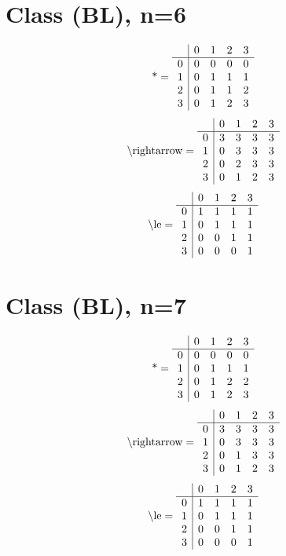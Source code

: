 \documentclass[11pt]{article}
\begin{document}
\section{Class (BL), n=6}
\[\text{*} = 
\begin{array}{r | r r r r}
 & 0 & 1 & 2 & 3 \\ \hline
0 & 0 & 0 & 0 & 0 \\
1 & 0 & 1 & 1 & 1 \\
2 & 0 & 1 & 1 & 2 \\
3 & 0 & 1 & 2 & 3 \\
\end{array}
\]
\[\text{\textbackslash rightarrow} = 
\begin{array}{r | r r r r}
 & 0 & 1 & 2 & 3 \\ \hline
0 & 3 & 3 & 3 & 3 \\
1 & 0 & 3 & 3 & 3 \\
2 & 0 & 2 & 3 & 3 \\
3 & 0 & 1 & 2 & 3 \\
\end{array}
\]
\[\text{\textbackslash le} = 
\begin{array}{r | r r r r}
 & 0 & 1 & 2 & 3 \\ \hline
0 & 1 & 1 & 1 & 1 \\
1 & 0 & 1 & 1 & 1 \\
2 & 0 & 0 & 1 & 1 \\
3 & 0 & 0 & 0 & 1 \\
\end{array}
\]

\section{Class (BL), n=7}
\[\text{*} = 
\begin{array}{r | r r r r}
 & 0 & 1 & 2 & 3 \\ \hline
0 & 0 & 0 & 0 & 0 \\
1 & 0 & 1 & 1 & 1 \\
2 & 0 & 1 & 2 & 2 \\
3 & 0 & 1 & 2 & 3 \\
\end{array}
\]
\[\text{\textbackslash rightarrow} = 
\begin{array}{r | r r r r}
 & 0 & 1 & 2 & 3 \\ \hline
0 & 3 & 3 & 3 & 3 \\
1 & 0 & 3 & 3 & 3 \\
2 & 0 & 1 & 3 & 3 \\
3 & 0 & 1 & 2 & 3 \\
\end{array}
\]
\[\text{\textbackslash le} = 
\begin{array}{r | r r r r}
 & 0 & 1 & 2 & 3 \\ \hline
0 & 1 & 1 & 1 & 1 \\
1 & 0 & 1 & 1 & 1 \\
2 & 0 & 0 & 1 & 1 \\
3 & 0 & 0 & 0 & 1 \\
\end{array}
\]
\end{document}
